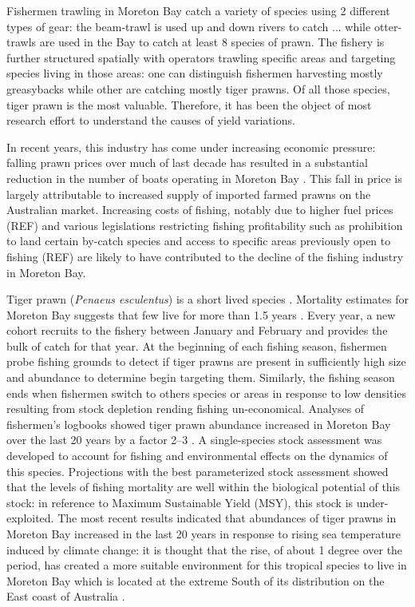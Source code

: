 Fishermen trawling in Moreton Bay catch a variety of species using 2 different types of gear: the beam-trawl is used up and down rivers to catch ... while otter-trawls are used in the Bay to catch at least 8 species of prawn. The fishery is further structured spatially with operators trawling specific areas and targeting species living in those areas: one can distinguish fishermen harvesting mostly greasybacks while other are catching mostly tiger prawns. Of all those species, tiger prawn is the most valuable. Therefore, it has been the object of most research effort to understand the causes of yield variations.

In recent years, this industry has come under increasing economic pressure: falling prawn prices over much of last decade has resulted in a substantial reduction in the number of boats operating in Moreton Bay \cite{Pascoe2017121}. This fall in price is largely attributable to increased supply of imported farmed prawns on the Australian market. Increasing costs of fishing, notably due to higher fuel prices (REF) and various legislations restricting fishing profitability such as prohibition to land certain by-catch species and access to specific areas previously open to fishing (REF) are likely to have contributed to the decline of the fishing industry in Moreton Bay.

Tiger prawn ({\it Penaeus esculentus}) is a short lived species \citep{garcia88c}. Mortality estimates for Moreton Bay suggests that few live for more than 1.5 years \citep{KienzleEtAl2015}. Every year, a new cohort recruits to the fishery between January and February \citep{KienzleEtAl2015} and provides the bulk of catch for that year. At the beginning of each fishing season, fishermen probe fishing grounds to detect if tiger prawns are present in sufficiently high size and abundance to determine begin targeting them. Similarly, the fishing season ends when fishermen switch to others species or areas in response to low densities resulting from stock depletion rending fishing un-economical. Analyses of fishermen's logbooks showed tiger prawn abundance increased in Moreton Bay over the last 20 years by a factor 2--3 \citep{Kienzle2014138}. A single-species stock assessment was developed to account for fishing and environmental effects on the dynamics of this species. Projections with the best parameterized stock assessment showed that the levels of fishing mortality are well within the biological potential of this stock: in reference to Maximum Sustainable Yield (MSY), this stock is under-exploited. The most recent results indicated that abundances of tiger prawns in Moreton Bay increased in the last 20 years in response to rising sea temperature induced by climate change: it is thought that the rise, of about 1 degree over the period, has created a more suitable environment for this tropical species to live in Moreton Bay which is located at the extreme South of its distribution on the East coast of Australia \citep{KienzleEtAl2017}.







